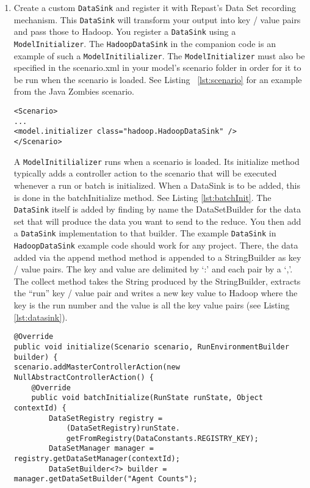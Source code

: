 \documentclass[11pt]{amsart}
\begin{document}
\begin{enumerate}
\item
Create a custom  \texttt{DataSink}  and register it with Repast's Data Set recording mechanism. This \texttt{DataSink} will transform your output into key / value pairs and pass those to Hadoop. You register a  \texttt{DataSink} using a \texttt{ModelInitializer}. The \texttt{HadoopDataSink} in the companion code is an example of such a \texttt{ModelInitilializer}. The \texttt{ModelInitializer} must also be specified in the scenario.xml in your model's scenario folder in order for it to be run when the scenario is loaded. See Listing ~\ref{lst:scenario} for an example from the Java Zombies scenario.

\noindent\begin{minipage}[h]{\textwidth}
\vspace{.2in}
\lstset{language=xml,caption=Specifying the ModelInitializer in scenario.xml,label=lst:scenario}
\begin{lstlisting}
<Scenario>
...
<model.initializer class="hadoop.HadoopDataSink" />
</Scenario>
\end{lstlisting}
\vspace{.2in}
\end{minipage}

A \texttt{ModelInitilializer} runs when a scenario is loaded. Its initialize method typically adds a controller action to the scenario that will be executed whenever a run or batch is initialized. When a DataSink is to be added, this is done in the batchInitialize method. See Listing \ref{lst:batchInit}. The \texttt{DataSink} itself is added by finding by name the DataSetBuilder for the data set that will produce the data you want to send to the reduce. You then add a \texttt{DataSink} implementation to that builder. The example  \texttt{DataSink} in  \texttt{HadoopDataSink} example code should work for any project. There, the data added via the append method method is appended to a StringBuilder as key / value pairs. The key and value are delimited by `:' and each pair by a `,'. The collect method takes the String produced by the StringBuilder, extracts the ``run'' key / value pair and writes a new key value to Hadoop where the key is the run number and the value is all the key value pairs (see Listing \ref{lst:datasink}).

\noindent\begin{minipage}[h]{\textwidth}
\vspace{.2in}
\lstset{language=java,caption=Adding the Controller Action with a ModelInitializer,label=lst:batchInit}
\begin{lstlisting}
@Override
public void initialize(Scenario scenario, RunEnvironmentBuilder builder) {
scenario.addMasterControllerAction(new NullAbstractControllerAction() {
	@Override
	public void batchInitialize(RunState runState, Object contextId) {
		DataSetRegistry registry = 
			(DataSetRegistry)runState.
			getFromRegistry(DataConstants.REGISTRY_KEY);
		DataSetManager manager = registry.getDataSetManager(contextId);
		DataSetBuilder<?> builder = manager.getDataSetBuilder("Agent Counts");
		

\end{lstlisting}
\end{minipage}
\end{enumerate}
\end{document}
